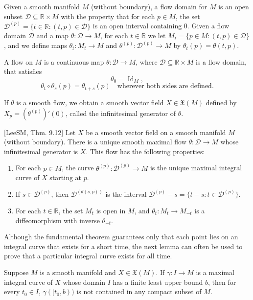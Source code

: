 Given a smooth manifold $M$ (without boundary), a flow domain for $M$ is an
open subset $\mathcal{D} \subseteq \mathbb{R} \times M$ with the property that for each $p \in M$, the set $\mathcal{D}^{(p)} =
\{t \in \mathbb{R} : (t, p) \in \mathcal{D}\}$ is an open interval containing 0. Given a flow domain $\mathcal{D}$ and a
map $\theta: \mathcal{D} \to M$, for each $t \in \mathbb{R}$ we let $M_t = \{p \in M : (t, p) \in \mathcal{D}\}$, and we define
maps $\theta_t: M_t \to M$ and $\theta^{(p)}: \mathcal{D}^{(p)} \to M$ by $\theta_t(p) = \theta(t, p)$.

A flow on $M$ is a continuous map $\theta: \mathcal{D} \to M$, where $\mathcal{D} \subseteq \mathbb{R} \times M$ is a flow
domain, that satisfies
\[
\theta_0 = \operatorname{Id}_M,
\]
\[
\theta_t \circ \theta_s(p) = \theta_{t+s}(p) \quad \text{wherever both sides are defined}.
\]

If $\theta$ is a smooth flow, we obtain a smooth vector field $X \in \mathfrak{X}(M)$ defined by $X_p =
(\theta^{(p)})' (0)$, called the infinitesimal generator of $\theta$.

\begin{theorem}
\label{thm:fundamental-theorem-on-flows}
[LeeSM, Thm. 9.12] Let $X$ be a smooth vector field on a smooth manifold $M$ (without boundary). There is a
unique smooth maximal flow $\theta: \mathcal{D} \to M$ whose infinitesimal generator is $X$. This
flow has the following properties:
\begin{enumerate}[label=(\alph*)]
\item For each $p \in M$, the curve $\theta^{(p)}: \mathcal{D}^{(p)} \to M$ is the unique maximal integral
curve of $X$ starting at $p$.
\item If $s \in \mathcal{D}^{(p)}$, then $\mathcal{D}^{(\theta(s,p))}$ is the interval $\mathcal{D}^{(p)} - s = \{t - s : t \in \mathcal{D}^{(p)}\}$.
\item For each $t \in \mathbb{R}$, the set $M_t$ is open in $M$, and $\theta_t: M_t \to M_{-t}$ is a diffeomorphism with inverse $\theta_{-t}$.
\end{enumerate}
\end{theorem}

Although the fundamental theorem guarantees only that each point lies on an
integral curve that exists for a short time, the next lemma can often be used to prove
that a particular integral curve exists for all time.

\begin{lemma}
\label{lem:escape-lemma}
Suppose $M$ is a smooth manifold and $X \in \mathfrak{X}(M)$.
If $\gamma: I \to M$ is a maximal integral curve of $X$ whose domain $I$ has a finite least
upper bound $b$, then for every $t_0 \in I$, $\gamma([t_0, b))$ is not contained in any compact
subset of $M$.
\end{lemma}

